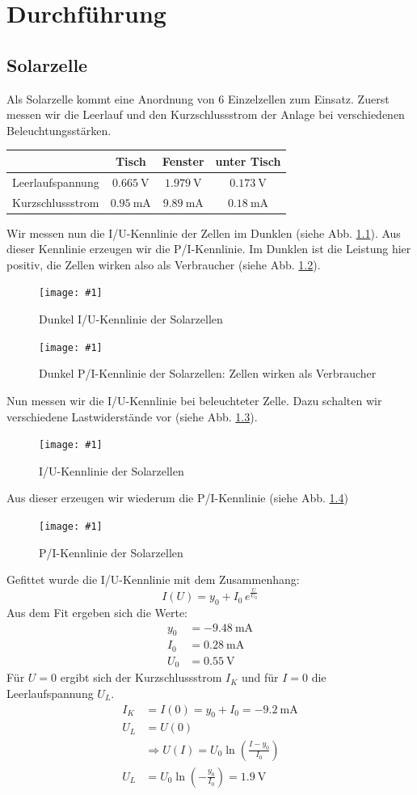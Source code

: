﻿\newcommand{\mess}[3] {
\begin{figure}[htbp]
	\centering
	\texttt{[image: \#1]}
	\caption{#2}
	\label{#3}
\end{figure} }
\newcommand{\refabb}[1]{(siehe Abb. \ref{#1})}
\chapter{Durchführung}

\section{Solarzelle}
Als Solarzelle kommt eine Anordnung von 6 Einzelzellen zum Einsatz. Zuerst messen wir die Leerlauf und den Kurzschlussstrom der Anlage bei verschiedenen Beleuchtungsstärken.
\begin{center}
\begin{tabular}{ |  l  c  c  c | }
\hline
	& Tisch	& Fenster & unter Tisch \\ \hline	
Leerlaufspannung & $\SI{0,665}{\volt}$	& $\SI{1,979}{\volt}$	& $\SI{0,173}{\volt}$ \\ 
Kurzschlussstrom & $\SI{0,95}{\milli \ampere}$	& $\SI{9,89}{\milli \ampere}$	& $\SI{0,18}{\milli \ampere}$ \\ 
\hline
\end{tabular}
\end{center}

Wir messen nun die I/U-Kennlinie der Zellen im Dunklen \refabb{a2}.
Aus dieser Kennlinie erzeugen wir die P/I-Kennlinie. Im Dunklen ist die Leistung hier positiv, die Zellen wirken also als Verbraucher \refabb{a2pi}. 
\mess{mess/aufg2.pdf}{Dunkel I/U-Kennlinie der Solarzellen}{a2}
\mess{mess/aufg2_pi.pdf}{Dunkel P/I-Kennlinie der Solarzellen: Zellen wirken als Verbraucher}{a2pi}

Nun messen wir die I/U-Kennlinie bei beleuchteter Zelle. Dazu schalten wir verschiedene Lastwiderstände vor \refabb{a3}. 
\mess{mess/aufg3_iu.pdf}{I/U-Kennlinie der Solarzellen}{a3}
Aus dieser erzeugen wir wiederum die P/I-Kennlinie \refabb{a3pi}
\mess{mess/aufg3_pi.pdf}{P/I-Kennlinie der Solarzellen}{a3pi} 
Gefittet wurde die I/U-Kennlinie mit dem Zusammenhang:
\[
I(U) = y_0 + I_0 \, e^{\frac{U}{U_0}}
\]
Aus dem Fit ergeben sich die Werte:
\begin{align*}
	y_0 &= \SI{-9.48}{\milli \ampere}\\
	I_0 &= \SI{0.28}{\milli \ampere}\\
	U_0 &= \SI{0.55}{\volt}
\end{align*}
Für $U=0$ ergibt sich der Kurzschlussstrom $I_K$ und für $I=0$ die Leerlaufspannung $U_L$.
\begin{align*}
	I_K &= I(0) = y_0 + I_0 = \SI{-9,2}{\milli \ampere} \\
	U_L &= U(0) \\
	&\Rightarrow U(I) = U_0 \ln \left( \frac{I-y_0}{I_0} \right) \\
	U_L &= U_0 \ln \left( -\frac{y_0}{I_0} \right) = \SI{1,9}{\volt}
\end{align*}

